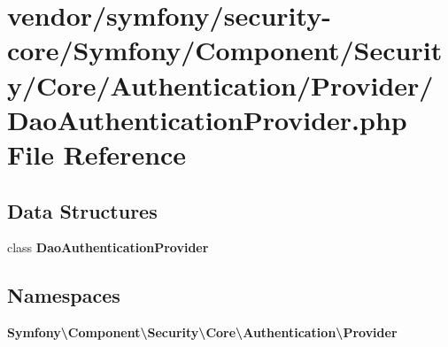 \section{vendor/symfony/security-\/core/\+Symfony/\+Component/\+Security/\+Core/\+Authentication/\+Provider/\+Dao\+Authentication\+Provider.php File Reference}
\label{_dao_authentication_provider_8php}
\subsection*{Data Structures}
\begin{DoxyCompactItemize}
\item 
class {\bf Dao\+Authentication\+Provider}
\end{DoxyCompactItemize}
\subsection*{Namespaces}
\begin{DoxyCompactItemize}
\item 
 {\bf Symfony\textbackslash{}\+Component\textbackslash{}\+Security\textbackslash{}\+Core\textbackslash{}\+Authentication\textbackslash{}\+Provider}
\end{DoxyCompactItemize}
